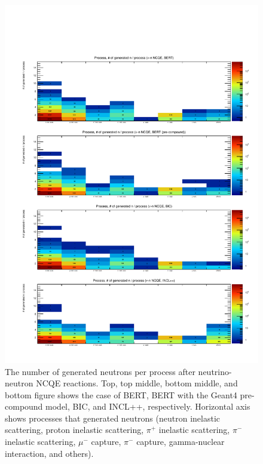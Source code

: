 \begin{figure}[h]
	\centering
	\includegraphics[width=15cm]{PDF/Secondary/Comparison_PreCompound/neutron/pdf2/Logz_Pro_NumSec_nuncqe_n}
	\caption[The number of generated neutrons per process after neutrino-neutron NCQE reactions]{
	The number of generated neutrons per process after neutrino-neutron NCQE reactions.
	Top, top middle, bottom middle, and bottom figure shows the case of BERT, BERT with the Geant4 pre-compound model, BIC, and INCL++, respectively.
	Horizontal axis shows processes that generated neutrons (neutron inelastic scattering, proton inelastic scattering, $\pi^{+}$ inelastic scattering, $\pi^{-}$ inelastic scattering, $\mu^{-}$ capture, $\pi^{-}$ capture, gamma-nuclear interaction, and others).
	}\label{Others_neutron_Logz_Pro_NumSec_nuncqe_n}
\end{figure}


